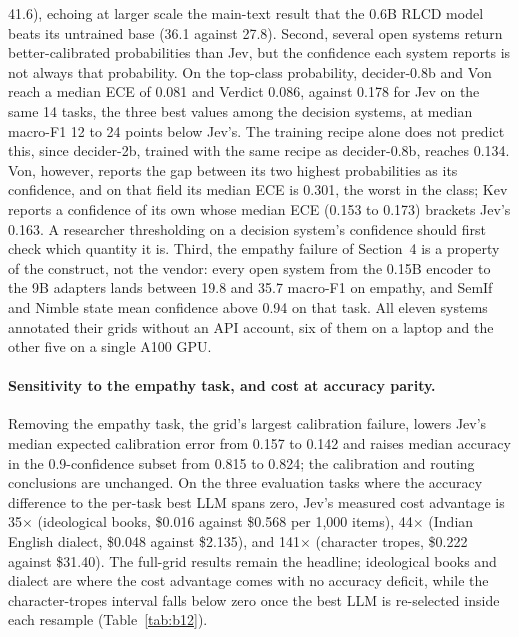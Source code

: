 \documentclass[11pt]{article}
\begin{document}
41.6), echoing at larger scale the main-text result that the 0.6B RLCD model beats its untrained base (36.1 against 27.8). Second, several open systems return better-calibrated probabilities than Jev, but the confidence each system reports is not always that probability. On the top-class probability, decider-0.8b and Von reach a median ECE of 0.081 and Verdict 0.086, against 0.178 for Jev on the same 14 tasks, the three best values among the decision systems, at median macro-F1 12 to 24 points below Jev's. The training recipe alone does not predict this, since decider-2b, trained with the same recipe as decider-0.8b, reaches 0.134. Von, however, reports the gap between its two highest probabilities as its confidence, and on that field its median ECE is 0.301, the worst in the class; Kev reports a confidence of its own whose median ECE (0.153 to 0.173) brackets Jev's 0.163. A researcher thresholding on a decision system's confidence should first check which quantity it is. Third, the empathy failure of Section~4 is a property of the construct, not the vendor: every open system from the 0.15B encoder to the 9B adapters lands between 19.8 and 35.7 macro-F1 on empathy, and SemIf and Nimble state mean confidence above 0.94 on that task. All eleven systems annotated their grids without an API account, six of them on a laptop and the other five on a single A100 GPU.
\begin{table}[!htbp]
\centering
\caption{Per-task macro-F1 ($\times 100$) for the commercial decision model (Jev), the two local models of the main evaluation, and the eleven open decision systems (marked $^{\dagger}$, ordered by size), each under its own released inference code. Medians are over the evaluation tasks each system covers ($^{d}$ marks pilot tasks, excluded from medians; -- marks the dialect cell outside SemIf's 16 answer slots; tropes exceeds every letter-readout architecture and is omitted). ECE is computed on each system's reported confidence and, in the $p_{\mathrm{top}}$ row, on its top-class probability.}
\label{tab:b11}
\footnotesize
\setlength{\tabcolsep}{3pt}

\end{table}

\paragraph{Sensitivity to the empathy task, and cost at accuracy parity.}
Removing the empathy task, the grid's largest calibration failure, lowers Jev's median expected calibration error from 0.157 to 0.142 and raises median accuracy in the 0.9-confidence subset from 0.815 to 0.824; the calibration and routing conclusions are unchanged. On the three evaluation tasks where the accuracy difference to the per-task best LLM spans zero, Jev's measured cost advantage is 35$\times$ (ideological books, \$0.016 against \$0.568 per 1{,}000 items), 44$\times$ (Indian English dialect, \$0.048 against \$2.135), and 141$\times$ (character tropes, \$0.222 against \$31.40). The full-grid results remain the headline; ideological books and dialect are where the cost advantage comes with no accuracy deficit, while the character-tropes interval falls below zero once the best LLM is re-selected inside each resample (Table~\ref{tab:b12}).
\end{document}
